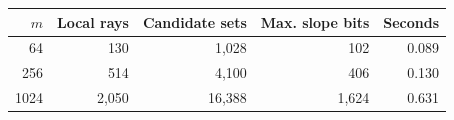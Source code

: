 \begin{tabular}{rrrrr}
\toprule
$m$ & Local rays & Candidate sets & Max. slope bits & Seconds\\
\midrule
64 & 130 & 1,028 & 102 & 0.089\\
256 & 514 & 4,100 & 406 & 0.130\\
1024 & 2,050 & 16,388 & 1,624 & 0.631\\
\bottomrule
\end{tabular}
